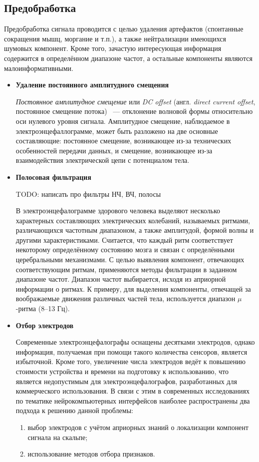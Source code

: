 \documentclass[12pt,fleqn]{article}
\begin{document}
	\subsection{Предобработка}
	\par Предобработка сигнала проводится с целью удаления артефактов (спонтанные сокращения мышц, моргание и т.п.), а также нейтрализации имеющихся шумовых компонент. Кроме того, зачастую интересующая информация содержится в определённом диапазоне частот, а остальные компоненты являются малоинформативными.
	\begin{itemize}
	\item {\bf Удаление постоянного амплитудного смещения}
	\par {\it Постоянное амплитудное смещение} или {\it DC offset} (англ. {\it direct current offset}, постоянное смещение потока) ~--- отклонение волновой формы относительно оси нулевого уровня сигнала. Амплитудное смещение, наблюдаемое в электроэнцефаллограмме, может быть разложено на две основные составляющие: постоянное смещение, возникающее из-за технических особенностей передачи данных, и  смещение, возникающее из-за взаимодействия электрической цепи с потенциалом тела.
	\item {\bf Полосовая фильтрация}
	\par TODO: написать про фильтры НЧ, ВЧ, полосы
	\par В электроэнцефалограмме здорового человека выделяют несколько характерных составляющих электрических колебаний, называемых ритмами, различающихся частотным диапазоном, а также амплитудой, формой волны и другими характеристиками. Считается, что каждый ритм соответствует некоторому определённому состоянию мозга и связан с определёнными церебральными механизмами. С целью выявления компонент, отвечающих соответствующим ритмам, применяются методы фильтрации в заданном диапазоне частот. Диапазон частот выбирается, исходя из априорной информации о ритмах. К примеру, для выделения компоненты, отвечащей за воображаемые движения различных частей тела, используется диапазон $\mu$-ритма (8--13 Гц).
	\item {\bf Отбор электродов}
	\par Современные электроэнцефалографы оснащены десятками электродов, однако информация, получаемая при помощи такого количества сенсоров, является избыточной. Кроме того, увеличение числа электродов ведёт к повышению стоимости устройства и времени на подготовку к использованию, что является недопустимым для электроэнцефалографов, разработанных для коммерческого использования. В связи с этим в современных исследованиях по тематике нейрокомпьютерных интерфейсов наиболее распространены два подхода к решению данной проблемы:
	\begin{enumerate}
	\item выбор электродов с учётом априорных знаний о локализации компонент сигнала на скальпе;
	\item использование методов отбора признаков.
	\end{enumerate}
	\end{itemize}
\end{document}
